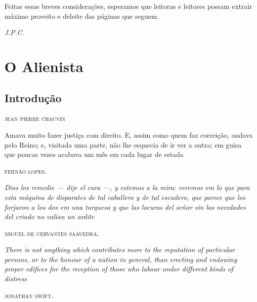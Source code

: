 Feitas essas breves considerações, esperamos que leitoras e leitores
possam extrair máximo proveito e deleite das páginas que seguem.

\bigskip

\hfill{}\emph{J.P.C.}

\part{O Alienista}

\chapter[Introdução, \emph{por Jean Pierre Chauvin}]{Introdução}

\begin{flushright}
\textsc{jean pierre chauvin}
\end{flushright}

\epigraph{Amava muito fazer justiça com direito. E, assim como quem faz
correição, andava pelo Reino; e, visitada uma parte, não lhe esquecia de
ir ver a outra; em guisa que poucas vezes acabava um mês em cada lugar
de estada}{\textsc{fernão lopes}.\footnotemark}

\epigraph{\emph{Dios los remedie --- dije el cura ---, y estemos a la mira:
veremos em lo que para esta máquina de disparates de tal caballero y de
tal escudero, que parece que los forjaron a los dos em una turquesa y
que las locuras del señor sin las necedades del criado no valian un
ardite}}{\textsc{miguel de cervantes saavedra}.\footnotemark}

\epigraph{\emph{There is not anything which contributes more to the reputation
of particular persons, or to the honour of a nation in general, than
erecting and endowing proper edifices for the reception of those who
labour under different kinds of distress}}{\textsc{jonathan swift}.\footnotemark}

